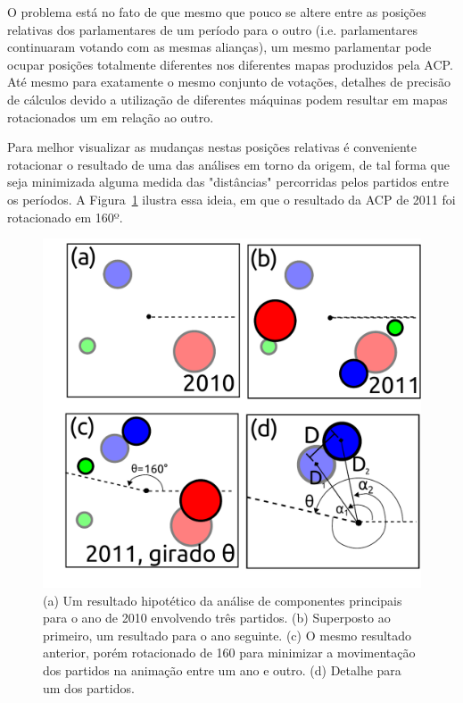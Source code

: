 \documentclass[a4paper, 12pt]{article}
\begin{document}
O problema está no fato de que mesmo que pouco se altere entre as posições relativas dos parlamentares de um período para o outro (i.e. parlamentares continuaram votando com as mesmas alianças), um mesmo parlamentar pode ocupar posições totalmente diferentes nos diferentes mapas produzidos pela ACP. Até mesmo para exatamente o mesmo conjunto de votações, detalhes de precisão de cálculos devido a utilização de diferentes máquinas podem resultar em mapas rotacionados um em relação ao outro.

Para melhor visualizar as mudanças nestas posições relativas é conveniente rotacionar o resultado de uma das análises em torno da origem, de tal forma que seja minimizada alguma medida das "distâncias" percorridas pelos partidos entre os períodos. A Figura~\ref{fig:rotacoes} ilustra essa ideia, em que o resultado da
ACP de 2011 foi rotacionado em 160º. \\

\begin{figure}[h]
  \centering
  \includegraphics[scale=0.5]{figs/rotacoes.pdf}
  \caption{(a) Um resultado hipotético da análise de componentes principais para o ano de 2010 envolvendo três partidos. (b) Superposto ao primeiro, um resultado para o ano seguinte. (c) O mesmo resultado anterior, porém rotacionado de 160\textdegree{} para minimizar a movimentação dos partidos na animação entre um ano e outro. (d) Detalhe para um dos partidos.}
  \label{fig:rotacoes}
\end{figure}
\end{document}
